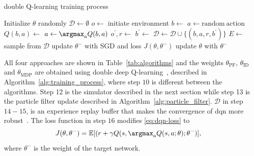 \begin{algorithm}[!t]
    \caption{double Q-learning training process}\label{alg:training_process}
    \begin{algorithmic}[1]
        \State Initialize $\theta$ randomly
        \State $\mathcal{D} \gets \emptyset$
            \State $o \gets $ initiate environment
            \Comment{\eqref{eq:observation}}
            \State $b \gets $ 
                    \State $a \gets \mathrm{random\ action}$
                \Else
                    \State $Q(b, a) \gets $
                    \State $a \gets \argmax_{a} Q(b,a)$
                    \Comment{\eqref{eq:optimal_policy}}
                \EndIf
                \State $o^\prime, r \gets $ 
                \State $b^\prime \gets $ 
                \State $\mathcal{D} \gets \mathcal{D} \cup \{(b, a, r, b^\prime)\}$
                \State $E \gets $ sample from $\mathcal{D}$
                \State update $\theta^-$ with SGD and loss $J(\theta,\theta^-)$ 
                \Comment{\eqref{eq:ddqn-loss}}
                    \State update $\theta$ with $\theta^-$
                \EndFor
            \EndWhile
        \EndFor
    \end{algorithmic}
\end{algorithm}

All four approaches are shown in Table~\ref{tab:algorithms} and the weights $\theta_\mathrm{PF}$, $\theta_\mathrm{ID}$ and $\theta_\mathrm{MDP}$ are obtained using double deep Q-learning~\cite{Hasselt2016ddqn}, described in Algorithm~\ref{alg:training_process}, where step $10$ is different between the algorithms. Step 12 is the simulator described in the next section while step 13 is the particle filter update described in Algorithm~\ref{alg:particle_filter}. $\mathcal{D}$ in step $14-15$, is an experience replay buffer that makes the convergence of \gls{dqn} more robust~\cite{Mnih2015}.
The loss function in step $16$ modifies \eqref{eq:dqn-loss} to
\begin{equation}
    J(\theta,\theta^-) = \mathbb{E}[(r + \gamma Q(s,\argmax_{a} Q(s,a;\theta);\theta^-)],
    \label{eq:ddqn-loss}
\end{equation}
where $\theta^-$ is the weight of the target network. 

